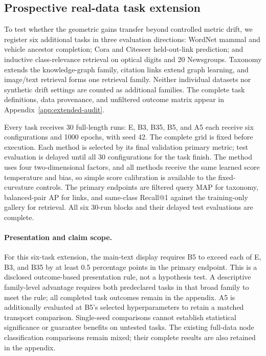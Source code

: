 

\subsection{Prospective real-data task extension}
\label{sec:new-tasks}
To test whether the geometric gains transfer beyond controlled metric drift, we register six additional tasks in three evaluation directions: WordNet mammal and vehicle ancestor completion; Cora and Citeseer held-out-link prediction; and inductive class-relevance retrieval on optical digits and 20 Newsgroups. Taxonomy extends the knowledge-graph family, citation links extend graph learning, and image/text retrieval forms one retrieval family. Neither individual datasets nor synthetic drift settings are counted as additional families. The complete task definitions, data provenance, and unfiltered outcome matrix appear in Appendix~\ref{app:extended-audit}.

Every task receives 30 full-length runs: E, B3, B35, B5, and A5 each receive six configurations and 1000 epochs, with seed 42. The complete grid is fixed before execution. Each method is selected by its final validation primary metric; test evaluation is delayed until all 30 configurations for the task finish. The method uses four two-dimensional factors, and all methods receive the same learned score temperature and bias, so simple score calibration is available to the fixed-curvature controls. The primary endpoints are filtered query MAP for taxonomy, balanced-pair AP for links, and same-class Recall@1 against the training-only gallery for retrieval. All six 30-run blocks and their delayed test evaluations are complete.

\paragraph{Presentation and claim scope.}
For this six-task extension, the main-text display requires B5 to exceed each of E, B3, and B35 by at least 0.5 percentage points in the primary endpoint. This is a disclosed outcome-based presentation rule, not a hypothesis test. A descriptive family-level advantage requires both predeclared tasks in that broad family to meet the rule; all completed task outcomes remain in the appendix. A5 is additionally evaluated at B5's selected hyperparameters to retain a matched transport comparison. Single-seed comparisons cannot establish statistical significance or guarantee benefits on untested tasks. The existing full-data node classification comparisons remain mixed; their complete results are also retained in the appendix.

